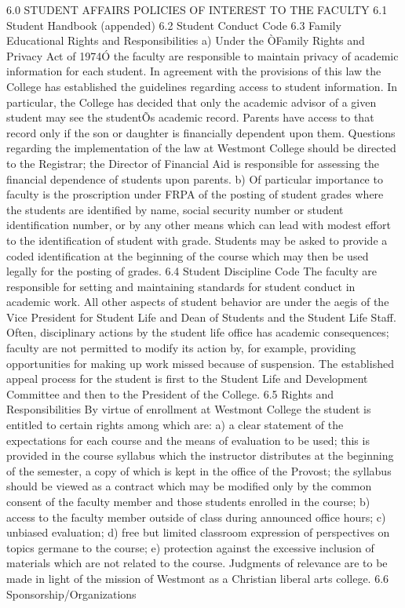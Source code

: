 \documentclass[letterpaper, 11pt]{article}
\begin{document}
6.0 STUDENT AFFAIRS POLICIES OF INTEREST TO THE FACULTY
6.1 Student Handbook (appended)
6.2 Student Conduct Code
6.3 Family Educational Rights and Responsibilities
a) Under the ÒFamily Rights and Privacy Act of 1974Ó the faculty are responsible to maintain privacy of academic information for each student.  In agreement with the provisions of this law the College has established the guidelines regarding access to student information.  In particular, the College has decided that only the academic advisor of a given student may see the studentÕs academic record.  Parents have access to that record only if the son or daughter is financially dependent upon them.  Questions regarding the implementation of the law at Westmont College should be directed to the Registrar; the Director of Financial Aid is responsible for assessing the financial dependence of students upon parents.
b) Of particular importance to faculty is the proscription under FRPA of the posting of student grades where the students are identified by name, social security number or student identification number, or by any other means which can lead with modest effort to the identification of student with grade.  Students may be asked to provide a coded identification at the beginning of the course which may then be used legally for the posting of grades.
6.4 Student Discipline Code
   The faculty are responsible for setting and maintaining standards for student conduct in academic work.  All other aspects of student behavior are under the aegis of the Vice President for Student Life and Dean of Students and the Student Life Staff.  Often, disciplinary actions by the student life office has academic consequences; faculty are not permitted to modify its action by, for example, providing opportunities for making up work missed because of suspension.  The established appeal process for the student is first to the Student Life and Development Committee and then to the President of the College.
6.5 Rights and Responsibilities
   By virtue of enrollment at Westmont College the student is entitled to certain rights among which are:
a) a clear statement of the expectations for each course and the means of evaluation to be used; this is provided in the course syllabus which the instructor distributes at the beginning of the semester, a copy of which is kept in the office of the Provost; the syllabus should be viewed as a contract which may be modified only by the common consent of the faculty member and those students enrolled in the course;
b) access to the faculty member outside of class during announced office hours;
c) unbiased evaluation;
d) free but limited classroom expression of perspectives on topics germane to the course;
e) protection against the excessive inclusion of materials which are not related to the course. Judgments of relevance are to be made in light of the mission of Westmont as a Christian liberal arts college.
6.6 Sponsorship/Organizations
\end{document}
